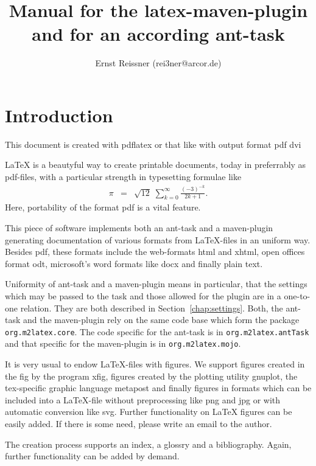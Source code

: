 \documentclass[12pt]{book}
\title{Manual for the latex-maven-plugin and for an according ant-task }
\author{Ernst Reissner (rei3ner@arcor.de)}
\begin{document}
\maketitle

\tableofcontents
\listoffigures
\listoftables


\chapter{Introduction}

This document is created with pdflatex or that like 
with output format 
\ifpdf
pdf
\else
dvi
\fi

\LaTeX{} is a beautyful way to create printable documents, 
today in preferrably as \gls{pdf}-files, 
with a particular strength in typesetting formulae like 
%
\begin{eqnarray*}
\pi & = & \sqrt{12}\;\sum^\infty_{k=0} \frac{(-3)^{-k}}{2k+1}. 
\end{eqnarray*}
%
Here, portability of the format \gls{pdf} is a vital feature. 

This piece of software implements both an ant-task and a maven-plugin 
generating documentation of various formats from \LaTeX-files 
in an uniform way. 
Besides \gls{pdf}, these formats include the web-formats \gls{html} 
and \gls{xhtml}, 
open offices format \gls{odt}, microsoft's word formats like \gls{docx} 
and finally plain text. 

Uniformity of ant-task and a maven-plugin means in particular, 
that the settings which may be passed to the task 
and those allowed for the plugin are in a one-to-one relation. 
They are both described in Section~\ref{chap:settings}. 
Both, the ant-task and the maven-plugin rely on the same code base 
which form the package {\tt org.m2latex.core}. 
The code specific for the ant-task is in {\tt org.m2latex.antTask} 
and that specific for the maven-plugin is in {\tt org.m2latex.mojo}. 

It is very usual to endow \LaTeX-files with figures. 
We support figures created in the \gls{fig} by the program xfig, 
figures created by the plotting utility gnuplot, 
the tex-specific graphic language metapost 
and finally figures in formats which can be included into a \LaTeX-file 
without preprocessing like \gls{png} and \gls{jpg} 
or with automatic conversion like \gls{svg}. 
Further functionality on \LaTeX{} figures can be easily added. 
If there is some need, please write an email to the author. 

The creation process supports an index, a glossry and a bibliography. 
Again, further functionality can be added by demand. 
\end{document}
